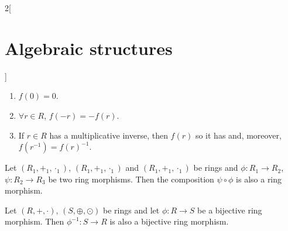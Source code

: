 \documentclass[../../../main.tex]{subfiles}
\begin{document}
\begin{multicols}{2}[\section{Algebraic structures}]
\begin{prop}
\begin{enumerate}
        \item $f(0)=0$.
        \item $\forall r\in R$, $f(-r)=-f(r)$.
        \item If $r\in R$ has a multiplicative inverse, then $f(r)$ so it has and, moreover, $f(r^{-1})=f(r)^{-1}$.
    \end{enumerate}
\end{prop}
\begin{prop}
    Let $(R_1,+_1,\cdot_1)$, $(R_1,+_1,\cdot_1)$ and $(R_1,+_1,\cdot_1)$ be rings and $\phi:R_1\rightarrow R_2$, $\psi:R_2\rightarrow R_3$ be two ring morphisms. Then the composition $\psi\circ\phi$ is also a ring morphism.
\end{prop}
\begin{prop}
    Let $(R,+,\cdot)$, $(S,\oplus,\odot)$ be rings and let $\phi: R\rightarrow S$ be a bijective ring morphism. Then $\phi^{-1}: S\rightarrow R$ is also a bijective ring morphism.
\end{prop}

\end{multicols}
\end{document}
